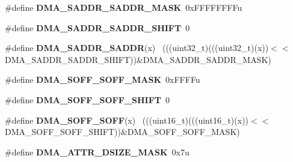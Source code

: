 \begin{DoxyCompactItemize}
\item 
\hypertarget{group___d_m_a___register___masks_ga3dbf7c2ee61861c859e0cb3a420a77f8}{}\#define {\bfseries D\+M\+A\+\_\+\+S\+A\+D\+D\+R\+\_\+\+S\+A\+D\+D\+R\+\_\+\+M\+A\+S\+K}~0x\+F\+F\+F\+F\+F\+F\+F\+Fu\label{group___d_m_a___register___masks_ga3dbf7c2ee61861c859e0cb3a420a77f8}

\item 
\hypertarget{group___d_m_a___register___masks_ga02af13fd09f7b39e0fbbbb8e28ddcf4d}{}\#define {\bfseries D\+M\+A\+\_\+\+S\+A\+D\+D\+R\+\_\+\+S\+A\+D\+D\+R\+\_\+\+S\+H\+I\+F\+T}~0\label{group___d_m_a___register___masks_ga02af13fd09f7b39e0fbbbb8e28ddcf4d}

\item 
\hypertarget{group___d_m_a___register___masks_gae9cfea018805ff942e9636dce598961b}{}\#define {\bfseries D\+M\+A\+\_\+\+S\+A\+D\+D\+R\+\_\+\+S\+A\+D\+D\+R}(x)                                          ~(((uint32\+\_\+t)(((uint32\+\_\+t)(x))$<$$<$D\+M\+A\+\_\+\+S\+A\+D\+D\+R\+\_\+\+S\+A\+D\+D\+R\+\_\+\+S\+H\+I\+F\+T))\&D\+M\+A\+\_\+\+S\+A\+D\+D\+R\+\_\+\+S\+A\+D\+D\+R\+\_\+\+M\+A\+S\+K)\label{group___d_m_a___register___masks_gae9cfea018805ff942e9636dce598961b}

\item 
\hypertarget{group___d_m_a___register___masks_ga2bca88a49fda82f9a61bb3d832a9c156}{}\#define {\bfseries D\+M\+A\+\_\+\+S\+O\+F\+F\+\_\+\+S\+O\+F\+F\+\_\+\+M\+A\+S\+K}~0x\+F\+F\+F\+Fu\label{group___d_m_a___register___masks_ga2bca88a49fda82f9a61bb3d832a9c156}

\item 
\hypertarget{group___d_m_a___register___masks_ga79f435a1aaf18a307644638b20599a9e}{}\#define {\bfseries D\+M\+A\+\_\+\+S\+O\+F\+F\+\_\+\+S\+O\+F\+F\+\_\+\+S\+H\+I\+F\+T}~0\label{group___d_m_a___register___masks_ga79f435a1aaf18a307644638b20599a9e}

\item 
\hypertarget{group___d_m_a___register___masks_ga734a93187e456f81a6e7ad9d5e02dbe7}{}\#define {\bfseries D\+M\+A\+\_\+\+S\+O\+F\+F\+\_\+\+S\+O\+F\+F}(x)                                              ~(((uint16\+\_\+t)(((uint16\+\_\+t)(x))$<$$<$D\+M\+A\+\_\+\+S\+O\+F\+F\+\_\+\+S\+O\+F\+F\+\_\+\+S\+H\+I\+F\+T))\&D\+M\+A\+\_\+\+S\+O\+F\+F\+\_\+\+S\+O\+F\+F\+\_\+\+M\+A\+S\+K)\label{group___d_m_a___register___masks_ga734a93187e456f81a6e7ad9d5e02dbe7}

\item 
\hypertarget{group___d_m_a___register___masks_ga2093ce5434ffef34988c7e74999edbee}{}\#define {\bfseries D\+M\+A\+\_\+\+A\+T\+T\+R\+\_\+\+D\+S\+I\+Z\+E\+\_\+\+M\+A\+S\+K}~0x7u\label{group___d_m_a___register___masks_ga2093ce5434ffef34988c7e74999edbee}


\end{DoxyCompactItemize}
